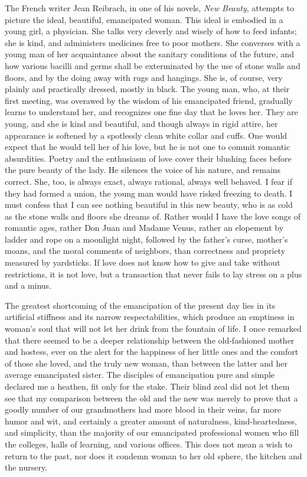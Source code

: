 The French writer Jean Reibrach, in one of his novels, \textit{New
Beauty}, attempts to picture the ideal, beautiful, emancipated woman.
This ideal is embodied in a young girl, a physician. She talks very
cleverly and wisely of how to feed infants; she is kind, and
administers medicines free to poor mothers. She converses with a young
man of her acquaintance about the sanitary conditions of the future,
and how various bacilli and germs shall be exterminated by the use of
stone walls and floors, and by the doing away with rugs and hangings.
She is, of course, very plainly and practically dressed, mostly in
black. The young man, who, at their first meeting, was overawed by the
wisdom of his emancipated friend, gradually learns to understand her,
and recognizes one fine day that he loves her. They are young, and she
is kind and beautiful, and though always in rigid attire, her
appearance is softened by a spotlessly clean white collar and cuffs.
One would expect that he would tell her of his love, but he is not one
to commit romantic absurdities. Poetry and the enthusiasm of love
cover their blushing faces before the pure beauty  of the
lady. He silences the voice of his nature, and remains correct. She,
too, is always exact, always rational, always well behaved. I fear if
they had formed a union, the young man would have risked freezing to
death. I must confess that I can see nothing beautiful in this new
beauty, who is as cold as the stone walls and floors she dreams of.
Rather would I have the love songs of romantic ages, rather Don Juan
and Madame Venus, rather an elopement by ladder and rope on a
moonlight night, followed by the father's curse, mother's moans, and
the moral comments of neighbors, than correctness and propriety
measured by yardsticks. If love does not know how to give and take
without restrictions, it is not love, but a transaction that never
fails to lay stress on a plus and a minus.

The greatest shortcoming of the emancipation of the present day lies
in its artificial stiffness and its narrow respectabilities, which
produce an emptiness in wo\-man's soul that will not let her drink
from the fountain of life. I once remarked that there seemed to be a
deeper relationship between the old-fashioned mother and hostess, ever
on the alert for the happiness of her little ones and the comfort of
those she loved, and the truly new woman, than between the latter and
her average emancipated sister. The disciples of emancipation pure and
simple declared me a heathen, fit only for the stake. Their blind zeal
did not let them see that my comparison between the old and the new
was merely to prove that a goodly number of our grandmothers had more
blood in their veins, far more humor and wit, and certainly 
a greater amount of naturalness, kind-heartedness, and simplicity,
than the majority of our emancipated professional women who fill the
colleges, halls of learning, and various offices. This does not mean a
wish to return to the past, nor does it condemn woman to her old
sphere, the kitchen and the nursery.

